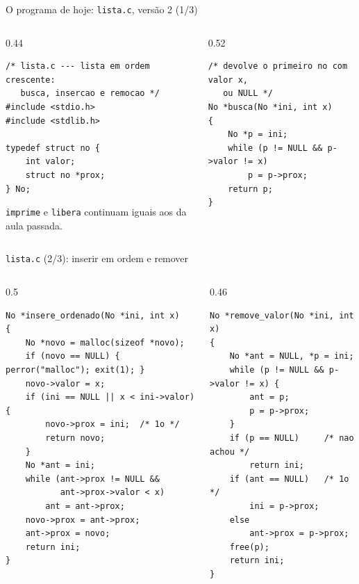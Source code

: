 \documentclass[aspectratio=169]{beamer}
\begin{document}
\begin{frame}[fragile]{O programa de hoje: \texttt{lista.c}, versão 2 (1/3)}
  \begin{columns}[T]
    \begin{column}{0.44\textwidth}
\begin{lstlisting}[style=codC]
/* lista.c --- lista em ordem crescente:
   busca, insercao e remocao */
#include <stdio.h>
#include <stdlib.h>

typedef struct no {
    int valor;
    struct no *prox;
} No;
\end{lstlisting}
      \small \texttt{imprime} e \texttt{libera} continuam iguais aos da aula
      passada.
    \end{column}
    \begin{column}{0.52\textwidth}
\begin{lstlisting}[style=codC]
/* devolve o primeiro no com valor x,
   ou NULL */
No *busca(No *ini, int x)
{
    No *p = ini;
    while (p != NULL && p->valor != x)
        p = p->prox;
    return p;
}
\end{lstlisting}
    \end{column}
  \end{columns}
\end{frame}

\begin{frame}[fragile]{\texttt{lista.c} (2/3): inserir em ordem e remover}
  \vspace{-0.5em}
  \begin{columns}[T]
    \begin{column}{0.5\textwidth}
\begin{lstlisting}[style=codC]
No *insere_ordenado(No *ini, int x)
{
    No *novo = malloc(sizeof *novo);
    if (novo == NULL) { perror("malloc"); exit(1); }
    novo->valor = x;
    if (ini == NULL || x < ini->valor) {
        novo->prox = ini;  /* 1o */
        return novo;
    }
    No *ant = ini;
    while (ant->prox != NULL &&
           ant->prox->valor < x)
        ant = ant->prox;
    novo->prox = ant->prox;
    ant->prox = novo;
    return ini;
}
\end{lstlisting}
    \end{column}
    \begin{column}{0.46\textwidth}
\begin{lstlisting}[style=codC]
No *remove_valor(No *ini, int x)
{
    No *ant = NULL, *p = ini;
    while (p != NULL && p->valor != x) {
        ant = p;
        p = p->prox;
    }
    if (p == NULL)     /* nao achou */
        return ini;
    if (ant == NULL)   /* 1o */
        ini = p->prox;
    else
        ant->prox = p->prox;
    free(p);
    return ini;
}
\end{lstlisting}
    \end{column}
  \end{columns}
\end{frame}
\end{document}
